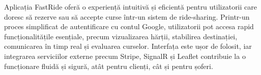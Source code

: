 Aplicația FastRide oferă o experiență intuitivă și eficientă pentru utilizatorii 
care doresc să rezerve sau să accepte curse într-un sistem de ride-sharing. 
Printr-un proces simplificat de autentificare cu contul Google, utilizatorii pot accesa
rapid funcționalitățile esențiale, precum vizualizarea hărții, stabilirea destinației, comunicarea în timp real și evaluarea curselor. 
Interfața este ușor de folosit, iar integrarea serviciilor externe precum Stripe, 
SignalR și Leaflet contribuie la o funcționare fluidă și sigură, atât pentru clienți, 
cât și pentru șoferi.